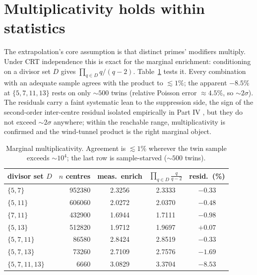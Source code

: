\documentclass[11pt]{article}
\theoremstyle{definition}
\begin{document}
\section{Multiplicativity holds within statistics}
The extrapolation's core assumption is that distinct primes' modifiers multiply. Under CRT independence this
is exact for the marginal enrichment: conditioning on a divisor set $D$ gives
$\prod_{q\in D}q/(q-2)$. Table~\ref{tab:mult} tests it. Every combination with an adequate sample agrees with
the product to $\lesssim1\%$; the apparent $-8.5\%$ at $\{5,7,11,13\}$ rests on only $\sim\!500$ twins
(relative Poisson error $\approx4.5\%$, so $\sim\!2\sigma$). The residuals carry a faint systematic lean to
the suppression side, the sign of the second-order inter-centre residual isolated empirically in Part IV
\cite{PIV}, but they do not exceed $\sim\!2\sigma$ anywhere; within the reachable range, multiplicativity is
confirmed and the wind-tunnel product is the right marginal object.

\begin{table}[t]
\centering
\small
\begin{tabular}{lrccc}
\toprule
divisor set $D$ & $n$ centres & meas.\ enrich & $\prod_{q\in D}\frac{q}{q-2}$ & resid.\ (\%)\\
\midrule
$\{5,7\}$ & 952380 & 2.3256 & 2.3333 & $-0.33$ \\
$\{5,11\}$ & 606060 & 2.0272 & 2.0370 & $-0.48$ \\
$\{7,11\}$ & 432900 & 1.6944 & 1.7111 & $-0.98$ \\
$\{5,13\}$ & 512820 & 1.9712 & 1.9697 & $+0.07$ \\
$\{5,7,11\}$ & 86580 & 2.8424 & 2.8519 & $-0.33$ \\
$\{5,7,13\}$ & 73260 & 2.7109 & 2.7576 & $-1.69$ \\
$\{5,7,11,13\}$ & 6660 & 3.0829 & 3.3704 & $-8.53$ \\
\bottomrule
\end{tabular}
\caption{Marginal multiplicativity. Agreement is $\lesssim1\%$ wherever the twin sample exceeds
$\sim\!10^{4}$; the last row is sample-starved ($\sim\!500$ twins).}
\label{tab:mult}
\end{table}
\end{document}
